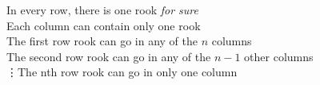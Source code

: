 \documentclass[preview]{standalone}
\begin{document}
\begin{center}
In every row, there is one rook \textit{for sure} \\ Each column can contain only one rook \\ The first row rook can go in any of the $n$ columns \\ The second row rook can go in any of the $n - 1$ other columns \\ \vdots The nth row rook can go in only one column
\end{center}
\end{document}

